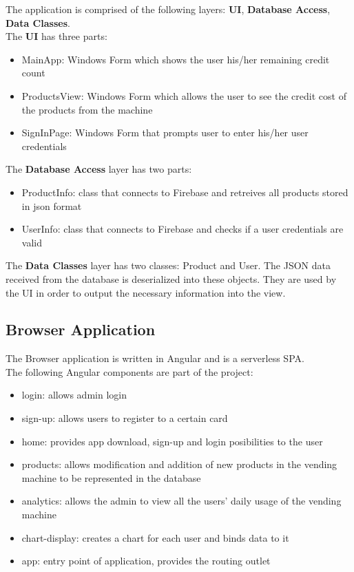 \documentclass[a4paper,11pt]{article}
\begin{document}
The application is comprised of the following layers: {\bf UI}, {\bf Database Access}, {\bf Data Classes}.\\

The {\bf UI} has three parts:
\begin{itemize}
\item MainApp: Windows Form which shows the user his/her remaining credit count
\item ProductsView: Windows Form which allows the user to see the credit cost of the products from the machine
\item SignInPage: Windows Form that prompts user to enter his/her user credentials\\
\end{itemize}

The {\bf Database Access} layer has two parts:
\begin{itemize}
\item ProductInfo: class that connects to Firebase and retreives all products stored in json format
\item UserInfo: class that connects to Firebase and checks if a user credentials are valid\\
\end{itemize}

The {\bf Data Classes} layer has two classes: Product and User. The JSON data received from the database
is deserialized into these objects. They are used by the UI in order to output the necessary information into the view.\\ 

\subsection{Browser Application}
The Browser application is written in Angular and is a serverless SPA.\\
The following Angular components are part of the project: 
\begin{itemize}
\item login: allows admin login
\item sign-up: allows users to register to a certain card 
\item home: provides app download, sign-up and login posibilities to the user 
\item products: allows modification and addition of new products in the vending machine to be represented in the database
\item analytics: allows the admin to view all the users' daily usage of the vending machine
\item chart-display: creates a chart for each user and binds data to it
\item app: entry point of application, provides the routing outlet\\
\end{itemize}
\end{document}
